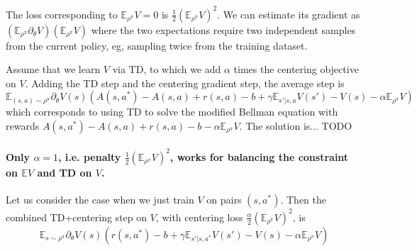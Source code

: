 \documentclass[11pt]{article}
\newcommand{\E}{\mathbb{E}}
\begin{document}
The loss corresponding to $\E_{\rho^\pi}V=0$ is $\frac12
(\E_{\rho^\pi}V)^2$. We can estimate its gradient as $(\E_{\rho^\pi}\partial_\theta
V)(\E_{\rho^\pi}V)$ where the two expectations require two independent
samples from the current policy, eg, sampling twice from the training
dataset.

Assume that we learn $V$ via TD, to which we add $\alpha$ times the
centering objective on $V$. Adding the TD step and the centering gradient
step, the average step is
\begin{equation}
\E_{(s,a)\sim\rho^\pi}\partial_\theta
V(s)(A(s,a^\ast)-A(s,a)+r(s,a)-b+\gamma \E_{s'|s,a}V(s')-V(s) - \alpha
\E_{\rho^\pi}V)
\end{equation}
which corresponds to using TD to solve the modified Bellman equation
with rewards $A(s,a^\ast)-A(s,a)+r(s,a)-b-\alpha \E_{\rho^\pi}V$. The
solution is... TODO

\paragraph{Only $\alpha=1$, i.e. penalty $\frac12
(\E_{\rho^\pi}V)^2$, works for balancing the constraint on $\E V$
and TD on $V$.}

Let us consider the case when we just train $V$ on pairs $(s,a^\ast)$.
Then the combined TD+centering step on $V$, with centering loss
$\frac{\alpha}{2} (\E_{\rho^\pi}V)^2$, is
\begin{equation}
\E_{s\sim\rho^\pi}\partial_\theta
V(s)(r(s,a^\ast)-b+\gamma \E_{s'|s,a^\ast}V(s')-V(s) - \alpha
\E_{\rho^\pi}V)
\end{equation}
\end{document}
